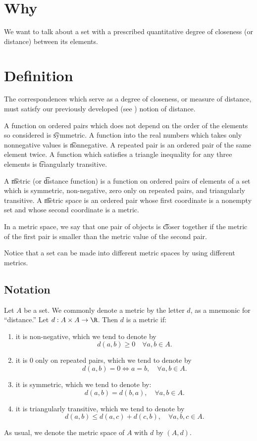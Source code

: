 

\section*{Why}

We want to talk about a set with a prescribed quantitative degree of closeness (or distance) between its elements.

\section*{Definition}

The correspondences which serve as a degree of closeness, or measure of distance, must satisfy our previously developed (see ) notion of distance.

A function on ordered pairs which does not depend on the order of the elements so considered is \t{symmetric}.
A function into the real numbers which takes only nonnegative values is \t{nonnegative}.
A repeated pair is an ordered pair of the same element twice.
A function which satisfies a triangle inequality for any three elements is \t{triangularly transitive}.

A \t{metric} (or \t{distance function}) is a function on ordered pairs of elements of a set which is symmetric, non-negative, zero only on repeated pairs, and triangularly transitive.
A \t{metric space} is an ordered pair whose first coordinate is a nonempty set and whose second coordinate is a metric.

In a metric space, we say that one pair of objects is \t{closer} together if the metric of the first pair is smaller than the metric value of the second pair.

Notice that a set can be made into different metric spaces by using different metrics.

\subsection*{Notation}

Let $A$ be a set.
We commonly denote a metric by the letter $d$, as a mnemonic for ``distance.''
Let $d: A \times  A \to \R $.
Then $d$ is a metric if:
    \begin{enumerate}
      \item it is non-negative, which we tend to denote by
\[
d(a, b) \geq 0 \quad \forall a,b \in A.
\]
      \item it is $0$ only on repeated pairs, which we tend to denote by
\[
d(a, b) = 0 \iff a = b, \quad \forall a,b \in A.
\]
      \item it is symmetric, which we tend to denote by:
\[
d(a, b) = d(b, a), \quad \forall a,b \in A.
\]
      \item it is triangularly transitive, which we tend to denote by
\[
d(a, b) \leq d(a, c) + d(c, b), \quad \forall a,b,c \in A.
\]
    \end{enumerate}
As usual, we denote the metric space of $A$ with $d$ by $(A, d)$.

